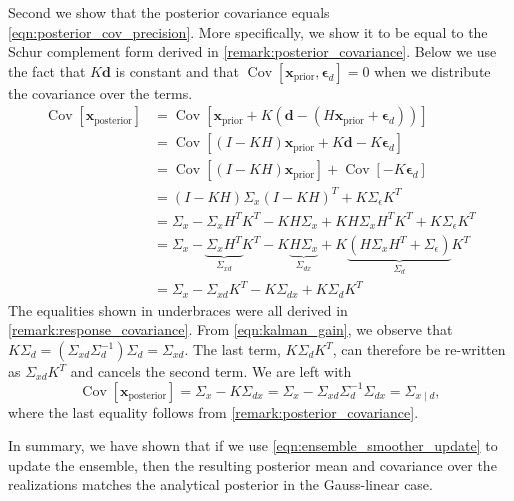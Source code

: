 \documentclass[12pt, a4paper]{article}
\theoremstyle{spaced}
\theoremstyle{spaceddef}
\numberwithin{equation}{section}
\begin{document}
Second we show that the posterior covariance equals \cref{eqn:posterior_cov_precision}.
More specifically, we show it to be equal to the Schur complement form derived in \cref{remark:posterior_covariance}.
Below we use the fact that $K\bm{d}$ is constant and that $\operatorname{Cov} \left[ \bm{x}_{\text{prior}},  \bm{\epsilon}_d \right] = 0$ when we distribute the covariance over the terms.
\begin{align*}
    \operatorname{Cov} \left[ \bm{x}_{\text{posterior}}  \right]
    &= \operatorname{Cov} \left[ \bm{x}_{\text{prior}} +
    K(
    \bm{d} - (H \bm{x}_{\text{prior}} + \bm{\epsilon}_d)
    )  \right] \\
    &= \operatorname{Cov} \left[
    (I - KH) \bm{x}_{\text{prior}}
    + K \bm{d}
    - K \bm{\epsilon}_d
     \right] \\
     &= \operatorname{Cov} \left[
     (I - KH) \bm{x}_{\text{prior}}
     \right] +
     \operatorname{Cov} \left[
     -K \bm{\epsilon}_d
     \right]
     \\
     &= (I - KH) \Sigma_{x} (I - KH)^T + K \Sigma_{\epsilon} K^T \\
     &= \Sigma_{x} - \Sigma_{x} H^T K^T - K H \Sigma_{x} + K H \Sigma_{x} H^T K^T + K \Sigma_{\epsilon} K^T \\
     &= \Sigma_{x} -
     \underbrace{\Sigma_{x} H^T}_{\Sigma_{xd}} K^T -
     K \underbrace{H \Sigma_{x}}_{\Sigma_{dx}} +
     K \underbrace{\left( H \Sigma_{x} H^T + \Sigma_{\epsilon} \right) }_{\Sigma_{d}} K^T \\
     &= \Sigma_{x} - \Sigma_{xd} K^T - K \Sigma_{dx} +
     K \Sigma_{d} K^T
\end{align*}
The equalities shown in underbraces were all derived in \cref{remark:response_covariance}.
From \cref{eqn:kalman_gain}, we observe that $K \Sigma_{d} = (\Sigma_{xd} \Sigma_{d}^{-1}) \Sigma_{d} = \Sigma_{xd}$.
The last term, $K \Sigma_{d} K^T$, can therefore be re-written as $\Sigma_{xd} K^T$ and cancels the second term.
We are left with
\begin{equation*}
    \operatorname{Cov} \left[ \bm{x}_{\text{posterior}}  \right]
    = \Sigma_{x}  - K \Sigma_{dx} = \Sigma_{x} - \Sigma_{xd} \Sigma_{d}^{-1} \Sigma_{dx}
    = \Sigma_{x \mid d},
\end{equation*}
where the last equality follows from \cref{remark:posterior_covariance}.

In summary, we have shown that if we use \cref{eqn:ensemble_smoother_update} to update the ensemble, then the resulting posterior mean and covariance over the realizations matches the analytical posterior in the Gauss-linear case.
\end{document}
